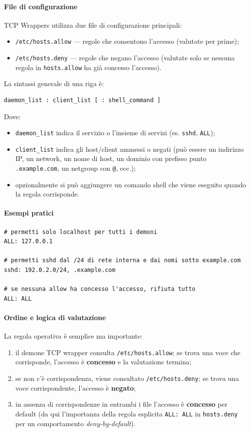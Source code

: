 \paragraph{File di configurazione}
TCP Wrappers utilizza due file di configurazione principali:
\begin{itemize}
  \item \texttt{/etc/hosts.allow} — regole che consentono l'accesso (valutate per prime);
  \item \texttt{/etc/hosts.deny}  — regole che negano l'accesso (valutate solo se nessuna regola in \texttt{hosts.allow} ha già concesso l'accesso).
\end{itemize}
La sintassi generale di una riga è:
\begin{verbatim}
daemon_list : client_list [ : shell_command ]
\end{verbatim}
Dove:
\begin{itemize}
  \item \texttt{daemon\_list} indica il servizio o l'insieme di servizi (es. \texttt{sshd}, \texttt{ALL});
  \item \texttt{client\_list} indica gli host/client ammessi o negati (può essere un indirizzo IP, un network, un nome di host, un dominio con prefisso punto \texttt{.example.com}, un netgroup con \texttt{@}, ecc.);
  \item opzionalmente si può aggiungere un comando shell che viene eseguito quando la regola corrisponde.
\end{itemize}

\paragraph{Esempi pratici}
\begin{verbatim}
# permetti solo localhost per tutti i demoni
ALL: 127.0.0.1

# permetti sshd dal /24 di rete interna e dai nomi sotto example.com
sshd: 192.0.2.0/24, .example.com

# se nessuna allow ha concesso l'accesso, rifiuta tutto
ALL: ALL
\end{verbatim}

\paragraph{Ordine e logica di valutazione}
La regola operativa è semplice ma importante:
\begin{enumerate}
  \item il demone TCP wrapper consulta \texttt{/etc/hosts.allow}; se trova una voce che corrisponde, l'accesso è \textbf{concesso} e la valutazione termina;
  \item se non c'è corrispondenza, viene consultato \texttt{/etc/hosts.deny}; se trova una voce corrispondente, l'accesso è \textbf{negato};
  \item in assenza di corrispondenze in entrambi i file l'accesso è \textbf{concesso} per default (da qui l'importanza della regola esplicita \texttt{ALL: ALL} in \texttt{hosts.deny} per un comportamento \textit{deny-by-default}).
\end{enumerate}

